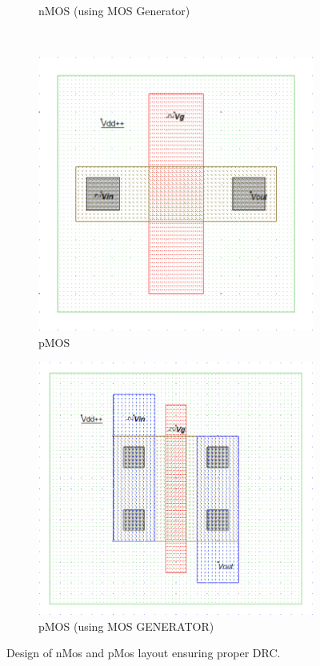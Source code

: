 \documentclass[a4paper,12pt]{article}
\begin{document}
\begin{figure}[H]
\begin{subfigure}[t]{0.49\textwidth}
			\caption{nMOS (using MOS Generator)}
			\label{fig:3-b}
		\end{subfigure}
		\\[2cm]
		\begin{subfigure}[t]{0.49\textwidth}
			\centering
			\includegraphics[width=1\textwidth, height=0.25\textheight]{Images/pmos/pimg1.png}
			\caption{pMOS}
			\label{fig:3-b}
		\end{subfigure}
		\hfill
		\begin{subfigure}[t]{0.49\textwidth}
			\centering
			\includegraphics[width=1\textwidth, height=0.25\textheight]{Images/Builtin pmos/pmos2.png}
			\caption{pMOS (using MOS GENERATOR)}
			\label{fig:3-b}
		\end{subfigure}
		\caption{  Design of nMos and pMos layout ensuring proper DRC.}
		\label{fig:1}
	\end{figure}
	
\end{document}
